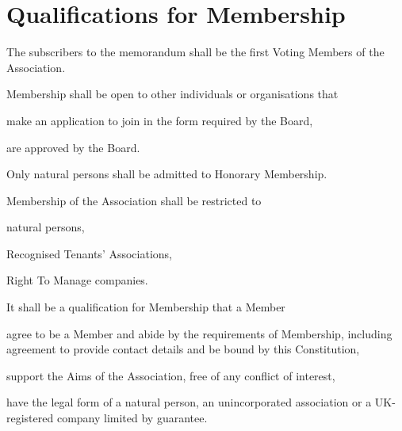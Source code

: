 \documentclass[10pt]{mk-articles-of-association}
\newcommand{\EC}[0]{Board}
\newcommand{\RTA}[0]{Recognised Tenants' Association}
\begin{document}


\section{Qualifications for Membership}

\begin{constenum}

  \item The subscribers to the memorandum shall be the first Voting Members
    of the Association.

  \item Membership shall be open to other individuals or organisations that
    \begin{constenum}
      \item make an application to join in the form required by the \EC, \ITand
      \item are approved by the \EC.
    \end{constenum}

  \item Only natural persons shall be admitted to Honorary Membership.

  \item Membership of the Association shall be restricted to
    \begin{constenum}
    \item natural persons,
    \item \RTA{}s, \ITand
    \item Right To Manage companies.
    \end{constenum}

  \item It shall be a qualification for Membership that a Member
    \begin{constenum}

    \item agree to be a Member and abide by the requirements of
      Membership, including agreement to provide contact details and
      be bound by this Constitution,

    \item support the Aims of the Association, free of any conflict
      of interest,

    \item have the legal form of a natural person, an unincorporated
      association or a UK-registered company limited by guarantee.

    \end{constenum}


\end{constenum}
\end{document}
